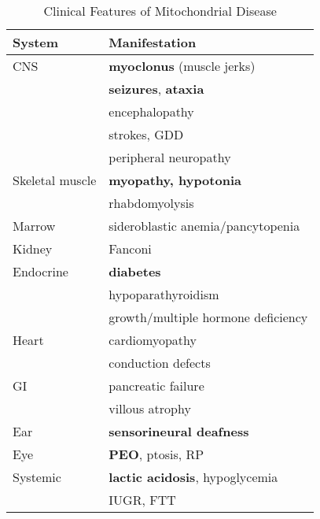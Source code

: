 \documentclass[12pt]{scrartcl}
\begin{document}
\begin{table}[htbp]
\caption{\label{tab:orgb06b326}Clinical Features of Mitochondrial Disease}
\centering
\begin{tabular}{ll}
System & Manifestation\\
\hline
CNS & \textbf{myoclonus} (muscle jerks)\\
 & \textbf{seizures}, \textbf{ataxia}\\
 & encephalopathy\\
 & strokes, GDD\\
 & peripheral neuropathy\\
Skeletal muscle & \textbf{myopathy, hypotonia}\\
 & rhabdomyolysis\\
Marrow & sideroblastic anemia/pancytopenia\\
Kidney & Fanconi\\
Endocrine & \textbf{diabetes}\\
 & hypoparathyroidism\\
 & growth/multiple hormone deficiency\\
Heart & cardiomyopathy\\
 & conduction defects\\
GI & pancreatic failure\\
 & villous atrophy\\
Ear & \textbf{sensorineural deafness}\\
Eye & \textbf{PEO}, ptosis, RP\\
Systemic & \textbf{lactic acidosis}, hypoglycemia\\
 & IUGR, FTT\\
\end{tabular}
\end{table}
\end{document}
